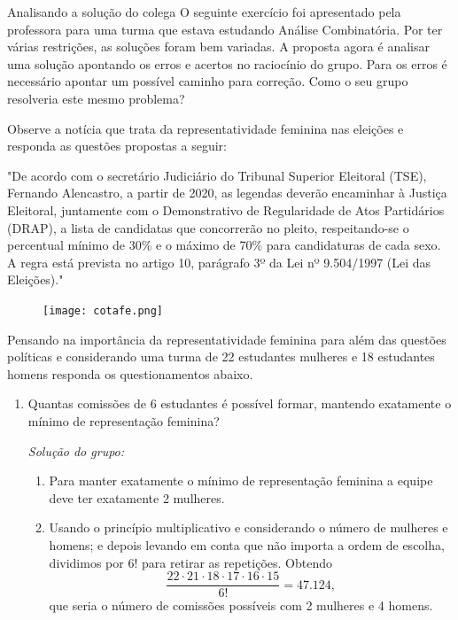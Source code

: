 \begin{task}{Analisando a solução do colega}
O seguinte exercício foi apresentado pela professora para uma turma que estava estudando Análise Combinatória. Por ter várias restrições, as soluções foram bem variadas. A proposta agora é analisar uma solução apontando os erros e acertos no raciocínio do grupo. Para os erros é necessário apontar um possível caminho para correção. Como o seu grupo resolveria este mesmo problema?
 

 Observe a notícia que trata da representatividade feminina nas eleições e responda as questões propostas a seguir:
 

 
"De acordo com o secretário Judiciário do Tribunal Superior Eleitoral (TSE), Fernando Alencastro, a partir de 2020, as legendas deverão encaminhar à Justiça Eleitoral, juntamente com o Demonstrativo de Regularidade de Atos Partidários (DRAP), a lista de candidatas que concorrerão no pleito, respeitando-se o percentual mínimo de 30\% e o máximo de 70\% para candidaturas de cada sexo. A regra está prevista no artigo 10, parágrafo 3º da Lei nº 9.504/1997 (Lei das Eleições)."


\begin{figure}[H]
\centering

\texttt{[image: cotafe.png]}

\end{figure}


Pensando na importância da representatividade feminina para além das questões políticas e considerando uma turma de 22 estudantes mulheres e 18 estudantes homens responda os questionamentos abaixo. 
 
\begin{enumerate}
\item Quantas comissões de 6 estudantes é possível formar, mantendo exatamente o mínimo de representação feminina?

\textit{Solução do grupo:}  

\begin{enumerate}[label=\titem{\arabic*.}]
\item Para manter exatamente o mínimo de representação feminina a equipe deve ter exatamente 2 mulheres.
\item Usando o princípio multiplicativo e considerando o número de mulheres e homens; e depois levando em conta que não importa a ordem de escolha, dividimos por $6!$ para retirar as repetições. Obtendo
$$\dfrac{22\cdot 21\cdot 18 \cdot 17 \cdot 16 \cdot 15}{6!} = 47.124,$$
que seria o número de comissões possíveis com 2 mulheres e 4 homens. 
\end{enumerate}




\end{enumerate}
\end{task}
